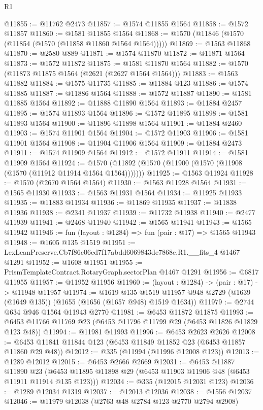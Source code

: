 \begin{lexlean}{R1}
\begin{coremodule}
@11855 := @11762 @2473
@11857 := @1574 @11855 @1564
@11858 := @1572 @11857
@11860 := @1581 @11855 @1564
@11868 := @1570 (@11846 (@1570 (@11854 (@1570 (@11858 @11860 @1564 @1564)))))
@11869 := @1563 @11868
@11870 := @2580 @889
@11871 := @1574 @11870
@11872 := @11871 @1564
@11873 := @1572 @11872
@11875 := @1581 @11870 @1564
@11882 := @1570 (@11873 @11875 @1564 (@2621 (@2627 @1564 @1564)))
@11883 := @1563 @11882
@11884 := @1575 @11735
@11885 := @11884 @123
@11886 := @1574 @11885
@11887 := @11886 @1564
@11888 := @1572 @11887
@11890 := @1581 @11885 @1564
@11892 := @11888 @11890 @1564
@11893 := @11884 @2457
@11895 := @1574 @11893 @1564
@11896 := @1572 @11895
@11898 := @1581 @11893 @1564
@11900 := @11896 @11898 @1564
@11901 := @11884 @2460
@11903 := @1574 @11901 @1564
@11904 := @1572 @11903
@11906 := @1581 @11901 @1564
@11908 := @11904 @11906 @1564
@11909 := @11884 @2473
@11911 := @1574 @11909 @1564
@11912 := @1572 @11911
@11914 := @1581 @11909 @1564
@11924 := @1570 (@11892 (@1570 (@11900 (@1570 (@11908 (@1570 (@11912 @11914 @1564 @1564)))))))
@11925 := @1563 @11924
@11928 := @1570 (@2670 @1564 @1564)
@11930 := @1563 @11928 @1564
@11931 := @1565 @11930
@11933 := @1563 @11931 @1564
@11934 := @11925 @11933
@11935 := @11883 @11934
@11936 := @11869 @11935
@11937 := @11838 @11936
@11938 := @2341 @11937
@11939 := @11732 @11938
@11940 := @2477 @11939
@11941 := @2468 @11940
@11942 := @1565 @11941
@11943 := @1565 @11942
@11946 := fun (layout : @1284) => fun (pair : @17) => @1565 @11943
@11948 := @1605 @135 @1519
@11951 := LexLeanPreserve.Cb7f86c06ed7f17abdd6069843de7868e.R1.__fits_4 @1467 @1291
@11952 := @1608 @11951
@11955 := PrismTemplateContract.RotaryGraph.sectorPlan @1467 @1291
@11956 := @6817 @11955
@11957 := @11952 @11956
@11960 := (layout : @1284) -> (pair : @17) -> @11948 @11957
@11974 := @1619
    @135
    @1519
    @11957
    @948
    @2729
    (@1639 (@1649 @135))
    (@1655 (@1656 (@1657 @948) @1519 @1634))
@11979 := @2744 @634 @946 @1564 @11943 @2770
@11981 := @6453 @11872 @11875
@11993 := @6453 @11766 @11769 @23 (@6453 @11796 @11799 @29 (@6453 @11826 @11829 @123 @48))
@11994 := @11981 @11993
@11996 := @6453 @2623 @2626
@12008 := @6453 @11841 @11844 @123 (@6453 @11849 @11852 @23 (@6453 @11857 @11860 @29 @48))
@12012 := @335 (@11994 (@11996 @12008 @123))
@12013 := @1289 @12012
@12015 := @6453 @2666 @2669
@12031 := @6453
    @11887
    @11890
    @23
    (@6453 @11895 @11898 @29 (@6453 @11903 @11906 @48 (@6453 @11911 @11914 @135 @123)))
@12034 := @335 (@12015 @12031 @123)
@12036 := @1289 @12034 @1319
@12037 := @12013 @12036
@12038 := @1556 @12037
@12046 := @11979 @12038 (@2763 @48 @2784 @123 @2770 @2794 @2908)

\end{coremodule}
\end{lexlean}
